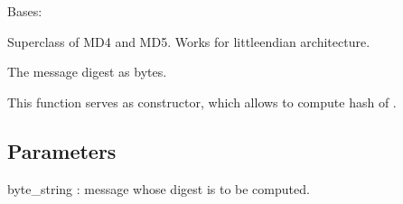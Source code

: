 \documentclass[letterpaper,10pt,english]{sphinxmanual}
\begin{document}
\begin{fulllineitems}
\label{\detokenize{todo_project_name:todo_project_name.mdn.MDN}}
\pysigstartsignatures
{}
\pysigstopsignatures
\sphinxAtStartPar
Bases: 

\sphinxAtStartPar
Superclass of MD4 and MD5. Works for little\sphinxhyphen{}endian architecture.

\begin{fulllineitems}
\label{\detokenize{todo_project_name:todo_project_name.mdn.MDN.digest}}
\pysigstartsignatures
{}
\pysigstopsignatures
\sphinxAtStartPar
The message digest as bytes.

\end{fulllineitems}


\begin{fulllineitems}
\label{\detokenize{todo_project_name:todo_project_name.mdn.MDN.from_bytes}}
\pysigstartsignatures
{}
\pysigstopsignatures
\sphinxAtStartPar
This function serves as constructor, which allows to compute hash
of .


\subsection{Parameters}
\label{\detokenize{todo_project_name:id3}}
\sphinxAtStartPar
byte\_string
: message whose digest is to be computed.

\end{fulllineitems}



\end{fulllineitems}
\end{document}
